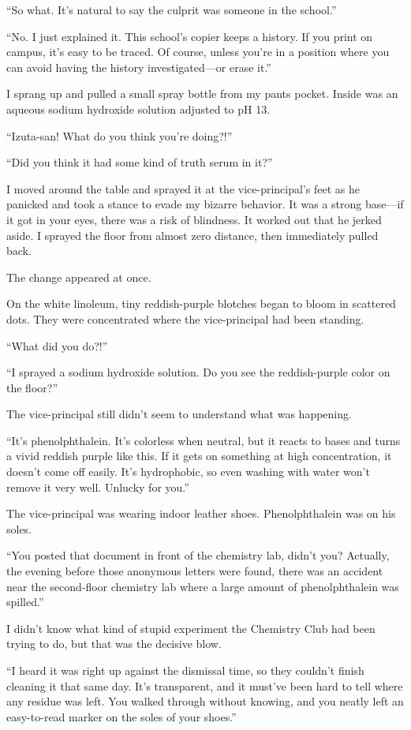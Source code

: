 \documentclass[
    a4paper,
    12pt,
    twoside,
    openany,
    UTF8,
    fontset=windows
]{ctexbook}
\begin{document}
``So what. It's natural to say the culprit was someone in the school.''

``No. I just explained it. This school's copier keeps a history. If you print on campus, it's easy to be traced. Of course, unless you're in a position where you can avoid having the history investigated---or erase it.''

I sprang up and pulled a small spray bottle from my pants pocket. Inside was an aqueous sodium hydroxide solution adjusted to pH 13.

``Izuta-san! What do you think you're doing?!''

``Did you think it had some kind of truth serum in it?''

I moved around the table and sprayed it at the vice-principal's feet as he panicked and took a stance to evade my bizarre behavior. It was a strong base---if it got in your eyes, there was a risk of blindness. It worked out that he jerked aside. I sprayed the floor from almost zero distance, then immediately pulled back.

The change appeared at once.

On the white linoleum, tiny reddish-purple blotches began to bloom in scattered dots. They were concentrated where the vice-principal had been standing.

``What did you do?!''

``I sprayed a sodium hydroxide solution. Do you see the reddish-purple color on the floor?''

The vice-principal still didn't seem to understand what was happening.

``It's phenolphthalein. It's colorless when neutral, but it reacts to bases and turns a vivid reddish purple like this. If it gets on something at high concentration, it doesn't come off easily. It's hydrophobic, so even washing with water won't remove it very well. Unlucky for you.''

The vice-principal was wearing indoor leather shoes. Phenolphthalein was on his soles.

``You posted that document in front of the chemistry lab, didn't you? Actually, the evening before those anonymous letters were found, there was an accident near the second-floor chemistry lab where a large amount of phenolphthalein was spilled.''

I didn't know what kind of stupid experiment the Chemistry Club had been trying to do, but that was the decisive blow.

``I heard it was right up against the dismissal time, so they couldn't finish cleaning it that same day. It's transparent, and it must've been hard to tell where any residue was left. You walked through without knowing, and you neatly left an easy-to-read marker on the soles of your shoes.''
\end{document}
